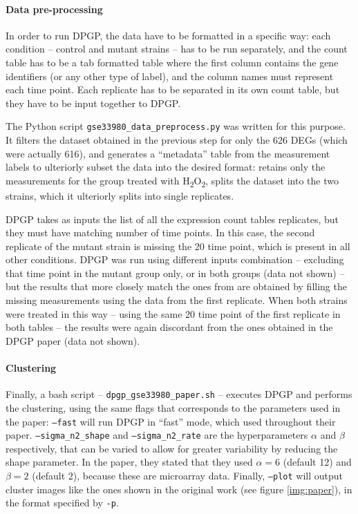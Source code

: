 \paragraph{Data pre-processing} In order to run DPGP, the data have to be formatted in a specific way: each condition -- control and mutant strains -- has to be run separately, and the count table has to be a tab formatted table where the first column contains the gene identifiers (or any other type of label), and the column names must represent each time point. Each replicate has to be separated in its own count table, but they have to be input together to DPGP.

The Python script \texttt{gse33980\_data\_preprocess.py} was written for this purpose. It filters the dataset obtained in the previous step for only the 626 DEGs (which were actually 616), and generates a ``metadata'' table from the measurement labels to ulteriorly subset the data into the desired format: retains only the measurements for the group treated with H\textsubscript{2}O\textsubscript{2}, splits the dataset into the two strains, which it ulteriorly splits into single replicates.

DPGP takes as inputs the list of all the expression count tables replicates, but they must have matching number of time points. In this case, the second replicate of the mutant strain is missing the \SI{20}{\min} time point, which is present in all other conditions. DPGP was run using different inputs combination -- excluding that time point in the mutant group only, or in both groups (data not shown) -- but the results that more closely match the ones from \citeauthor{mcdowellClusteringGeneExpression2018} are obtained by filling the missing measurements using the data from the first replicate. When both strains were treated in this way -- using the same \SI{20}{\min} time point of the first replicate in both tables -- the results were again discordant from the ones obtained in the DPGP paper (data not shown).

\paragraph{Clustering} Finally, a bash script -- \texttt{dpgp\_gse33980\_paper.sh} -- executes DPGP and performs the clustering, using the same flags that corresponds to the parameters used in the paper: \texttt{--fast} will run DPGP in ``fast'' mode, which \citeauthor{mcdowellClusteringGeneExpression2018} used throughout their paper. \texttt{--sigma\_n2\_shape} and \texttt{--sigma\_n2\_rate} are the hyperparameters $\alpha$ and $\beta$ respectively, that can be varied to allow for greater variability by reducing the shape parameter. In the paper, they stated that they used $\alpha=6$ (default 12) and $\beta=2$ (default 2), because these are microarray data. Finally, \texttt{--plot} will output cluster images like the ones shown in the original work (see figure \ref{img:paper}), in the format specified by \texttt{-p}.


